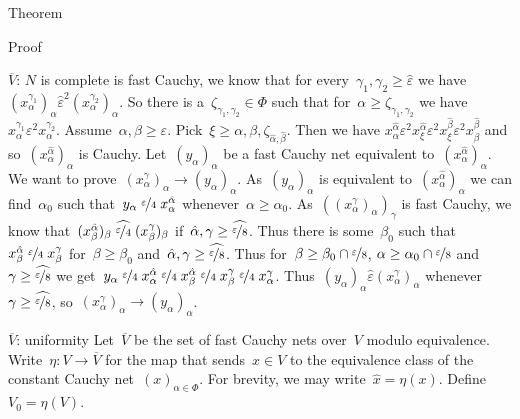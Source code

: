 \documentclass[b]{subfiles}
\begin{document}
\begin{parsec}
\begin{point}{Theorem}
\begin{point}{Proof}
\begin{point}{$\overline{V}$: $N$ is complete}
    is fast Cauchy,
    we know that for every~$\gamma_1,\gamma_2 \geq \hat\varepsilon$
we have~$
(x^{\gamma_1}_\alpha)_\alpha \mathrel{\hat\varepsilon^2}
        (x^{\gamma_2}_\alpha)_\alpha$.
So there is a~$\zeta_{\gamma_1,\gamma_2} \in \Phi$
such that for~$\alpha \geq \zeta_{\gamma_1,\gamma_2}$
    we have~$x^{\gamma_1}_\alpha
        \mathrel{\varepsilon^2}
        x^{\gamma_2}_\alpha$.
Assume~$\alpha,\beta \geq \varepsilon$.
Pick~$\xi \geq \alpha,\beta,\zeta_{\hat\alpha,\hat\beta}$.
Then we have $ x^{\hat{\alpha}}_\alpha
            \mathrel{\varepsilon^2}
        x^{\hat{\alpha}}_\xi
            \mathrel{\varepsilon^2}
        x^{\hat{\beta}}_\xi
            \mathrel{\varepsilon^2}
            x^{\hat{\beta}}_\beta$ and so~$(x_\alpha^{\hat\alpha})_\alpha$
            is Cauchy.
Let~$(y_\alpha)_\alpha$ be a fast Cauchy net equivalent
to~$(x^{\hat\alpha}_\alpha)_\alpha$.
We want to prove~$(x^\gamma_\alpha)_\alpha \to (y_\alpha)_\alpha$.
As~$(y_\alpha)_\alpha$ is equivalent to~$(x^{\hat\alpha}_\alpha)_\alpha$
    we can find~$\alpha_0$
    such that~$y_\alpha \mathrel{\nicefrac{\varepsilon}{4}} x^{\hat\alpha}_\alpha$
    whenever~$\alpha \geq \alpha_0$.
As~$((x^\gamma_\alpha)_\alpha)_\gamma$
is fast Cauchy,
we know that~$(x^{\hat\alpha}_\beta)_\beta
\mathrel{\widehat{\nicefrac{\varepsilon}{4}}}
(x^\gamma_\beta)_\beta $
if~$\hat{\alpha}, \gamma \geq \widehat{\nicefrac{\varepsilon}{8}}$.
Thus there is some~$\beta_0$ such
that~$x^{\hat\alpha}_\beta
\mathrel{\nicefrac{\varepsilon}{4}}
x^\gamma_\beta $
for~$\beta \geq \beta_0$
and~$\hat{\alpha}, \gamma \geq \widehat{\nicefrac{\varepsilon}{8}}$.
Thus for~$\beta \geq \beta_0 \cap \nicefrac{\varepsilon}{8}$,
$\alpha \geq \alpha_0 \cap \nicefrac{\varepsilon}{8}$
and~$\gamma \geq \widehat{\nicefrac{\varepsilon}{8}}$
we get~$y_\alpha
\mathrel{\nicefrac{\varepsilon}{4}}
x^{\hat{\alpha}}_\alpha
\mathrel{\nicefrac{\varepsilon}{4}}
x^{\hat{\alpha}}_\beta
\mathrel{\nicefrac{\varepsilon}{4}}
x^\gamma_\beta
\mathrel{\nicefrac{\varepsilon}{4}}
x^\gamma_\alpha$.
Thus~$(y_\alpha)_\alpha \mathrel{\hat\varepsilon} (x^\gamma_\alpha)_\alpha$
whenever~$\gamma \geq \widehat{\nicefrac{\varepsilon}{8}}$,
so~$(x^\gamma_\alpha)_\alpha \to (y_\alpha)_\alpha$.
\end{point}
\begin{point}{$\overline{V}$: uniformity}%
Let~$\overline{V}$ be the set of fast Cauchy nets over~$V$
    modulo equivalence.
Write~$\eta\colon V \to \overline{V}$
for the map that sends~$x \in V$
to the equivalence class of the constant Cauchy net~$(x)_{\alpha \in \Phi}$.
For brevity, we may write~$\hat{x} = \eta(x)$.
Define~$V_0 = \eta(V)$.


\end{point}
\end{point}
\end{point}
\end{parsec}
\end{document}

